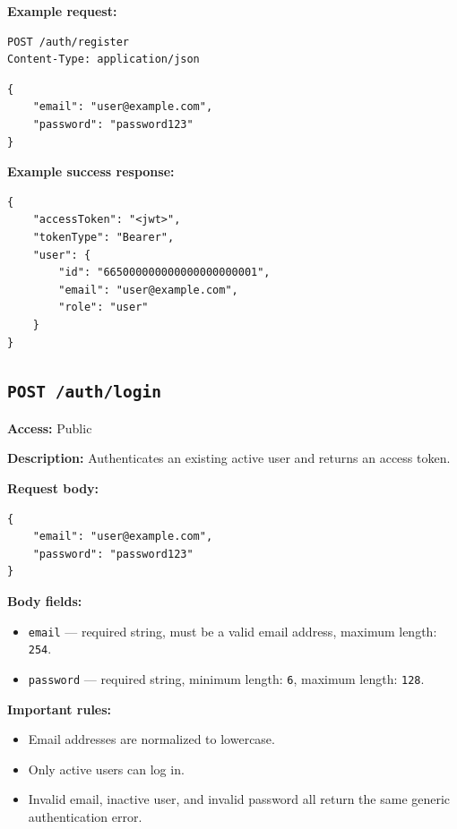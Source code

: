 \textbf{Example request:}

\begin{verbatim}
POST /auth/register
Content-Type: application/json
\end{verbatim}

\begin{verbatim}
{
	"email": "user@example.com",
	"password": "password123"
}
\end{verbatim}

\pagebreak
\textbf{Example success response:}

\begin{verbatim}
{
	"accessToken": "<jwt>",
	"tokenType": "Bearer",
	"user": {
		"id": "665000000000000000000001",
		"email": "user@example.com",
		"role": "user"
	}
}
\end{verbatim}

\subsection{\texttt{POST /auth/login}}

\textbf{Access:} Public

\textbf{Description:} Authenticates an existing active user and returns an access token.

\textbf{Request body:}

\begin{verbatim}
{
	"email": "user@example.com",
	"password": "password123"
}
\end{verbatim}

\textbf{Body fields:}

\begin{itemize}
    \item \texttt{email} --- required string, must be a valid email address, maximum length: \texttt{254}.
    \item \texttt{password} --- required string, minimum length: \texttt{6}, maximum length: \texttt{128}.
\end{itemize}

\textbf{Important rules:}

\begin{itemize}
    \item Email addresses are normalized to lowercase.
    \item Only active users can log in.
    \item Invalid email, inactive user, and invalid password all return the same generic authentication error.
\end{itemize}

